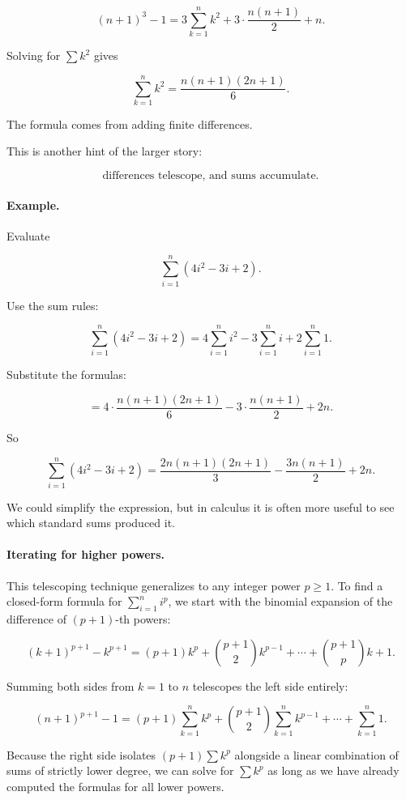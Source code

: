 \[
(n+1)^3-1
=
3\sum_{k=1}^{n}k^2
+
3\cdot \frac{n(n+1)}{2}
+
n.
\]

Solving for \(\sum k^2\) gives

\[
\sum_{k=1}^{n}k^2
=
\frac{n(n+1)(2n+1)}{6}.
\]

The formula comes from adding finite differences.

This is another hint of the larger story:

\[
\text{differences telescope, and sums accumulate.}
\]

\paragraph{Example.}
Evaluate

\[
\sum_{i=1}^{n}(4i^2-3i+2).
\]

Use the sum rules:

\[
\sum_{i=1}^{n}(4i^2-3i+2)
=
4\sum_{i=1}^{n}i^2
-
3\sum_{i=1}^{n}i
+
2\sum_{i=1}^{n}1.
\]

Substitute the formulas:

\[
=
4\cdot \frac{n(n+1)(2n+1)}{6}
-
3\cdot \frac{n(n+1)}{2}
+
2n.
\]

So

\[
\boxed{
\sum_{i=1}^{n}(4i^2-3i+2)
=
\frac{2n(n+1)(2n+1)}{3}
-
\frac{3n(n+1)}{2}
+
2n.
}
\]

We could simplify the expression, but in calculus it is often more useful to see which
standard sums produced it.

\paragraph{Iterating for higher powers.}
This telescoping technique generalizes to any integer power \(p \ge 1\). To find a closed-form formula for \(\sum_{i=1}^{n} i^p\), we start with the binomial expansion of the difference of \((p+1)\)-th powers:

\[
(k+1)^{p+1} - k^{p+1}
=
(p+1)k^p + \binom{p+1}{2}k^{p-1} + \cdots + \binom{p+1}{p}k + 1.
\]

Summing both sides from \(k=1\) to \(n\) telescopes the left side entirely:

\[
(n+1)^{p+1}-1
=
(p+1)\sum_{k=1}^{n}k^p 
+ 
\binom{p+1}{2}\sum_{k=1}^{n}k^{p-1} 
+ \cdots + 
\sum_{k=1}^{n}1.
\]

Because the right side isolates \((p+1)\sum k^p\) alongside a linear combination of sums of strictly lower degree, we can solve for \(\sum k^p\) as long as we have already computed the formulas for all lower powers.
